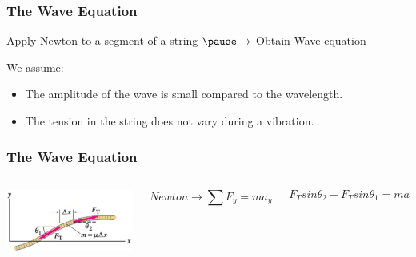 \documentclass[]{beamer}
\begin{document}
\begin{frame}


\frametitle{The Wave Equation}


Apply Newton  to a segment of a string $\pause \rightarrow$ Obtain Wave equation

\pause
\vspace{6mm}

We assume:

\pause
\vspace{2mm}



\begin{itemize}
\item The amplitude of the wave is small compared to the wavelength.

\pause
\item The tension in the string does not vary during a vibration.
\end{itemize}


  \end{frame}





\begin{frame}
  \frametitle{The Wave Equation}
  
  
  
     \begin{columns}[c]
     \column{2in}  %
     \begin{center}
    \includegraphics[height=1.in]{images4/10.jpg}
  \end{center}
  
  
  
  
  
  
     \column{2.5in}
  
     \pause
     \begin{equation*}
     Newton \rightarrow \sum F_y=ma_y
      \end{equation*}
      
      \pause
  
  
      \begin{equation*}
        F_Tsin\theta_2-F_Tsin\theta_1= m a
        \end{equation*}
  

  

  
  
  
  
     \end{columns}
  
  
  
  
  
  
  
  
  
    \end{frame}
\end{document}
